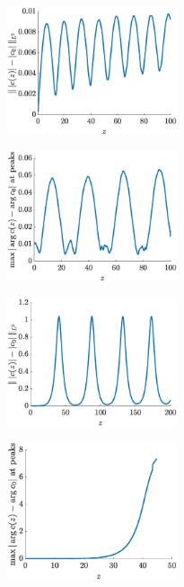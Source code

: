 \documentclass[11pt,reqno]{amsart}
\begin{document}
\begin{figure}
    \centering
    \begin{subfigure}{0.4\linewidth}
        \caption{}
        \label{fig:evolz1a}
        \includegraphics[width=5cm]{stableamp1.eps}
    \end{subfigure}
    \begin{subfigure}{0.4\linewidth}
        \caption{}
        \label{fig:evolz1b}
        \includegraphics[width=5cm]{stablephase1.eps}
    \end{subfigure}
        \begin{subfigure}{0.4\linewidth}
        \caption{}
        \label{fig:evolz1c}
        \includegraphics[width=5cm]{unstableamp1.eps}
    \end{subfigure}
    \begin{subfigure}{0.4\linewidth}
        \caption{}
        \label{fig:evolz1d}
        \includegraphics[width=5cm]{unstablephase1.eps}
    \end{subfigure}

\end{figure}
\end{document}
